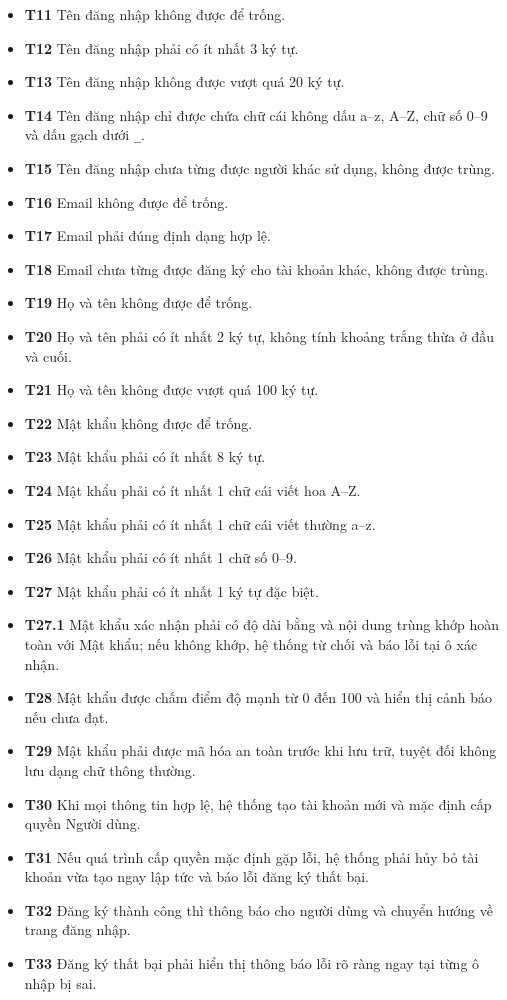 \documentclass[11pt,a4paper]{article}
\begin{document}
\begin{itemize}[leftmargin=0.9cm, label=$\bullet$, itemsep=2pt, topsep=4pt]
    \item \textbf{T11} Tên đăng nhập không được để trống.
    \item \textbf{T12} Tên đăng nhập phải có ít nhất 3 ký tự.
    \item \textbf{T13} Tên đăng nhập không được vượt quá 20 ký tự.
    \item \textbf{T14} Tên đăng nhập chỉ được chứa chữ cái không dấu a--z, A--Z, chữ số 0--9 và dấu gạch dưới \texttt{\_}.
    \item \textbf{T15} Tên đăng nhập chưa từng được người khác sử dụng, không được trùng.
    \item \textbf{T16} Email không được để trống.
    \item \textbf{T17} Email phải đúng định dạng hợp lệ.
    \item \textbf{T18} Email chưa từng được đăng ký cho tài khoản khác, không được trùng.
    \item \textbf{T19} Họ và tên không được để trống.
    \item \textbf{T20} Họ và tên phải có ít nhất 2 ký tự, không tính khoảng trắng thừa ở đầu và cuối.
    \item \textbf{T21} Họ và tên không được vượt quá 100 ký tự.
    \item \textbf{T22} Mật khẩu không được để trống.
    \item \textbf{T23} Mật khẩu phải có ít nhất 8 ký tự.
    \item \textbf{T24} Mật khẩu phải có ít nhất 1 chữ cái viết hoa A--Z.
    \item \textbf{T25} Mật khẩu phải có ít nhất 1 chữ cái viết thường a--z.
    \item \textbf{T26} Mật khẩu phải có ít nhất 1 chữ số 0--9.
    \item \textbf{T27} Mật khẩu phải có ít nhất 1 ký tự đặc biệt.
    \item \textbf{T27.1} Mật khẩu xác nhận phải có độ dài bằng và nội dung trùng khớp hoàn toàn với Mật khẩu; nếu không khớp, hệ thống từ chối và báo lỗi tại ô xác nhận.
    \item \textbf{T28} Mật khẩu được chấm điểm độ mạnh từ 0 đến 100 và hiển thị cảnh báo nếu chưa đạt.
    \item \textbf{T29} Mật khẩu phải được mã hóa an toàn trước khi lưu trữ, tuyệt đối không lưu dạng chữ thông thường.
    \item \textbf{T30} Khi mọi thông tin hợp lệ, hệ thống tạo tài khoản mới và mặc định cấp quyền Người dùng.
    \item \textbf{T31} Nếu quá trình cấp quyền mặc định gặp lỗi, hệ thống phải hủy bỏ tài khoản vừa tạo ngay lập tức và báo lỗi đăng ký thất bại.
    \item \textbf{T32} Đăng ký thành công thì thông báo cho người dùng và chuyển hướng về trang đăng nhập.
    \item \textbf{T33} Đăng ký thất bại phải hiển thị thông báo lỗi rõ ràng ngay tại từng ô nhập bị sai.
\end{itemize}
\end{document}
